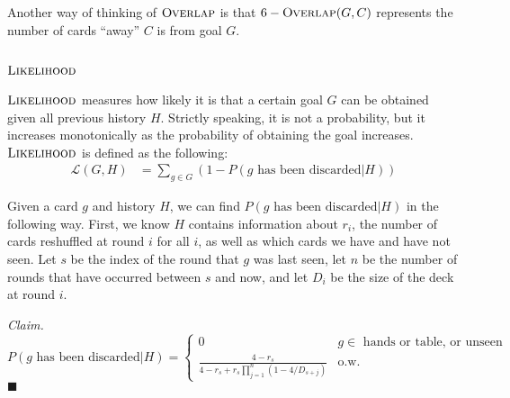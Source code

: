 \documentclass[11pt]{article}
\newcommand{\overlap}{\textsc{Overlap}}
\newcommand{\lkhd}{\textsc{Likelihood}}
\newenvironment{claim}[1]{\par\noindent\textit{Claim.}\space#1}{\hfill $\blacksquare$}
\begin{document}
Another way of thinking of $\overlap$ is that $6-\overlap(G,C)$ represents the number of cards ``away'' $C$ is from goal $G$.

\subsection{$\lkhd$}

$\lkhd$ measures how likely it is that a certain goal $G$ can be obtained given all previous history $H$. Strictly speaking, it is not a probability, but it increases monotonically as the probability of obtaining the goal increases. $\lkhd$ is defined as the following:
\begin{align}
  \mathcal{L}(G,H) &= \sum_{g \in G} (1 - P(g \text{ has been discarded}|H))
\end{align}

Given a card $g$ and history $H$, we can find $P(g \text{ has been discarded}|H)$ in the following way. First, we know $H$ contains information about $r_i$, the number of cards reshuffled at round $i$ for all $i$, as well as which cards we have and have not seen. Let $s$ be the index of the round that $g$ was last seen, let $n$ be the number of rounds that have occurred between $s$ and now, and let $D_i$ be the size of the deck at round $i$.

\begin{claim}
\begin{equation}
P(g \text{ has been discarded}|H) = \begin{cases}
  0 & g \in \text{ hands or table, or unseen} \\
  \frac{4-r_s}{4-r_s+r_s\prod_{j=1}^n(1-4/{D_{s+j}})} & \text{o.w.}
\end{cases}
\label{eq:p-discarded} \end{equation}
\end{claim}
\end{document}
